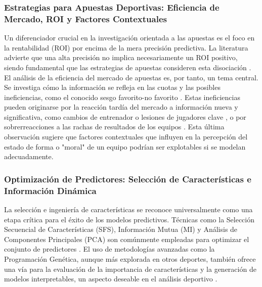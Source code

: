 \subsubsection{Estrategias para Apuestas Deportivas: Eficiencia de Mercado, ROI y Factores Contextuales}

Un diferenciador crucial en la investigación orientada a las apuestas es el foco en la rentabilidad (ROI) por encima de la mera precisión predictiva.
La literatura advierte que una alta precisión no implica necesariamente un ROI positivo, siendo fundamental que las estrategias de apuestas consideren esta disociación \cite{Wunderlinch2019AreBettingReturnsUseful}.
El análisis de la eficiencia del mercado de apuestas es, por tanto, un tema central. Se investiga cómo la información se refleja en las cuotas y las posibles ineficiencias, como el conocido sesgo favorito-no favorito \cite{Angelini2021InformationalEfficiency, Hegarti2024TaleOfTwoMarkets}.
Estas ineficiencias pueden originarse por la reacción tardía del mercado a información nueva y significativa, como cambios de entrenador \cite{Bernardo2018SemiStrong} o lesiones de jugadores clave \cite{Fisher2024PricingResponse}, o por sobrerreacciones a las rachas de resultados de los equipos \cite{Wheatcroft2020ProfitingOverreaction}. Esta última observación sugiere que factores contextuales que influyen en la percepción del estado de forma o "moral" de un equipo podrían ser explotables si se modelan adecuadamente. \\

\subsubsection{Optimización de Predictores: Selección de Características e Información Dinámica}

La selección e ingeniería de características se reconoce universalmente como una etapa crítica para el éxito de los modelos predictivos.
Técnicas como la Selección Secuencial de Características (SFS), Información Mutua (MI) y Análisis de Componentes Principales (PCA) son comúnmente empleadas para optimizar el conjunto de predictores \cite{Tammouch2024BettingML, Rodrigues2022FootballPredictionML}.
El uso de metodologías avanzadas como la Programación Genética, aunque más explorada en otros deportes, también ofrece una vía para la evaluación de la importancia de características y la generación de modelos interpretables, un aspecto deseable en el análisis deportivo \cite{Geng2020SportsGamesGP}.\\

